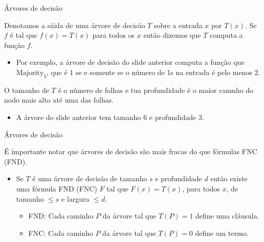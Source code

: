 \documentclass[landscape, 9pt]{beamer}
\newcommand{\Majority}{\text{Majority}}
\begin{document}
\begin{frame}{Árvores de decisão}

Denotamos a sáida de uma árvore de decisão $T$ sobre a entrada $x$ por $T(x)$. Se $f$ é tal que $f(x) = T(x)$ para todos os $x$ então dizemos que $T$ computa a função $f$.

\begin{itemize}

	\item Por exemplo, a árvore de decisão do slide anterior computa a função que $\Majority_{3}$, que é 1 se e somente se o número de 1s na entrada é pelo menos 2.

\end{itemize}

O tamanho de $T$ é o número de folhas e tua profundidade é o maior camnho do nodo mais alto até uma das folhas.

\begin{itemize}

	\item A árvore do slide anterior tem tamanho 6 e profundidade 3.

\end{itemize}

\end{frame}


\begin{frame} {Árvores de decisão}

É importante notar que árvores de decisão são mais fracas do que fórmulas FNC (FND).

\begin{itemize}

	\item Se $T$ é uma árvore de decisão de tamanho $s$ e profundidade $d$ então existe uma fórmula FND (FNC) $F$ tal que  $F(x) = T(x)$, para todos $x$, de tamanho $\leq s$ e largura $\leq d$.
	
	\begin{itemize}

		\item FND: Cada caminho $P$ da árvore tal que $T(P) = 1$ define uma cláusula.

		\item FNC: Cada caminho $P$ da árvore tal que $T(P) = 0$ define um termo.
	
	\end{itemize}

\end{itemize}

\end{frame}
\end{document}
